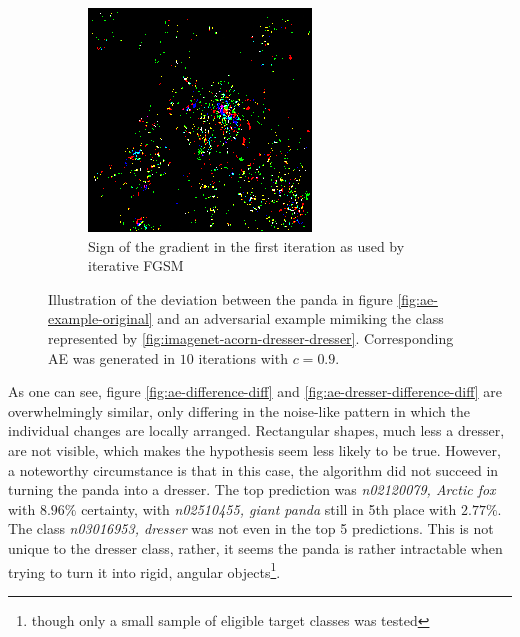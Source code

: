 \documentclass[11pt, a4paper]{article}
\begin{document}
\begin{figure}[htb]
\begin{subfigure}[b]{0.45\textwidth}
        \includegraphics[width=\textwidth]{aes_new/panda_dresser_10_0dot9_grad.png}
        \caption{Sign of the gradient in the first iteration as used by iterative FGSM}
        \label{fig:ae-dresser-difference-grad}
    \end{subfigure}
    \caption{Illustration of the deviation between the panda in figure \ref{fig:ae-example-original} and an adversarial example mimiking the class represented by \ref{fig:imagenet-acorn-dresser-dresser}. Corresponding AE was generated in $10$ iterations with $c = 0.9$.}
    \label{fig:ae-dresser-difference}
\end{figure}

As one can see, figure \ref{fig:ae-difference-diff} and \ref{fig:ae-dresser-difference-diff} are overwhelmingly similar, only differing in the noise-like pattern in which the individual changes are locally arranged. Rectangular shapes, much less a dresser, are not visible, which makes the hypothesis seem less likely to be true. However, a noteworthy circumstance is that in this case, the algorithm did not succeed in turning the panda into a dresser. The top prediction was \emph{n02120079, Arctic fox} with $8.96\%$ certainty, with \emph{n02510455, giant panda} still in 5th place with $2.77\%$. The class \emph{n03016953, dresser} was not even in the top 5 predictions. This is not unique to the dresser class, rather, it seems the panda is rather intractable when trying to turn it into rigid, angular objects\footnote{though only a small sample of eligible target classes was tested}.
\end{document}
